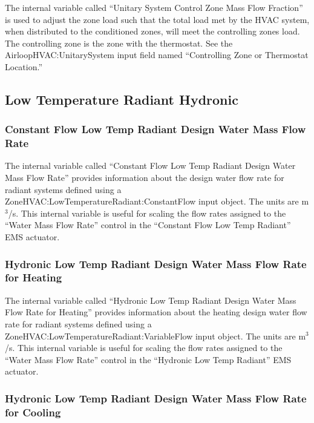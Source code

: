 The internal variable called ``Unitary System Control Zone Mass Flow Fraction'' is used to adjust the zone load such that the total load met by the HVAC system, when distributed to the conditioned zones, will meet the controlling zones load. The controlling zone is the zone with the thermostat. See the AirloopHVAC:UnitarySystem input field named ``Controlling Zone or Thermostat Location.''

\subsection{Low Temperature Radiant Hydronic}\label{low-temperature-radiant-hydronic-000}

\subsubsection{Constant Flow Low Temp Radiant Design Water Mass Flow Rate}\label{constant-flow-low-temp-radiant-design-water-mass-flow-rate}

The internal variable called ``Constant Flow Low Temp Radiant Design Water Mass Flow Rate'' provides information about the design water flow rate for radiant systems defined using a ZoneHVAC:LowTemperatureRadiant:ConstantFlow input object. The units are m\(^{3}\)/s. This internal variable is useful for scaling the flow rates assigned to the ``Water Mass Flow Rate'' control in the ``Constant Flow Low Temp Radiant'' EMS actuator.

\subsubsection{Hydronic Low Temp Radiant Design Water Mass Flow Rate for Heating}\label{hydronic-low-temp-radiant-design-water-mass-flow-rate-for-heating}

The internal variable called ``Hydronic Low Temp Radiant Design Water Mass Flow Rate for Heating'' provides information about the heating design water flow rate for radiant systems defined using a ZoneHVAC:LowTemperatureRadiant:VariableFlow input object. The units are m\(^{3}\)/s. This internal variable is useful for scaling the flow rates assigned to the ``Water Mass Flow Rate'' control in the ``Hydronic Low Temp Radiant'' EMS actuator.

\subsubsection{Hydronic Low Temp Radiant Design Water Mass Flow Rate for Cooling}\label{hydronic-low-temp-radiant-design-water-mass-flow-rate-for-cooling}

